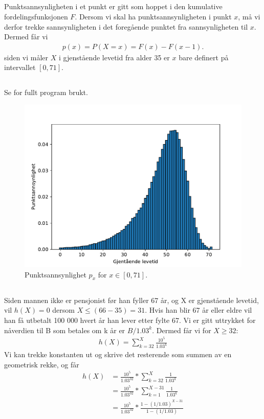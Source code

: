 \documentclass[a4paper,10pt, norsk]{article}
\begin{document}
\subsection{}
Punktsannsynligheten i et punkt er gitt som hoppet i den kumulative fordelingsfunksjonen $F$. Dersom vi skal ha punktsannsynligheten i punkt $x$, må vi derfor trekke sannsynligheten i det foregående punktet fra sannsynligheten til $x$. Dermed får vi
\begin{align*}
    p(x)
    = P(X = x)
    = F(x) - F(x-1).
\end{align*}
siden vi måler $X$ i gjenstående levetid fra alder 35 er $x$ bare definert på intervallet $[0, 71]$. 

\subsection{}
Se  for fullt program brukt.
\begin{figure}[h!]
        \centering 
        \includegraphics[scale=.85]{punktsannsynlighet.pdf} 
        \caption{Punktsannsynlighet $p_x$ for $x\in[0, 71]$.}
        \label{fig:px}
\end{figure}

\newpage
\subsection{}
Siden mannen ikke er pensjonist før han fyller 67 år, og X er gjenstående levetid, vil $h(X) = 0$ dersom $X \leq (66-35) = 31$. Hvis han blir 67 år eller eldre vil han få utbetalt 100 000 hvert år han lever etter fylte 67. Vi er gitt uttrykket for nåverdien til B som betales om k år er $B/1.03^k$. Dermed får vi for $X \geq 32$:
\begin{align*}
    h(X)
    = \sum_{k=32}^{X} \frac{10^5}{1.03^k}
\end{align*}
Vi kan trekke konstanten ut og skrive det resterende som summen av en geometrisk rekke, og får
\begin{align*}
    h(X)
    &= \frac{10^5}{1.03^{32}} * \sum_{k=32}^{X} \frac{1}{1.03^k} \\
    &= \frac{10^5}{1.03^{32}} * \sum_{k=1}^{X-31} \frac{1}{1.03^k} \\
    &= \frac{10^5}{1.03^{32}} * \frac{1-(1/1.03)^{X-31}}{1-(1/1.03)}
\end{align*}
\end{document}
